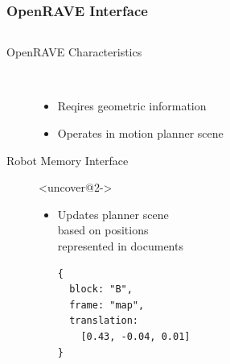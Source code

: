 \begin{frame}[fragile]
  \frametitle{OpenRAVE Interface}
  \begin{columns}
    \begin{column}{0.6\textwidth}
  \begin{description}
  \item[OpenRAVE Characteristics]%
                \hfill \\
    \begin{itemize}
    \item Reqires geometric information
    \item Operates in motion planner scene
    \end{itemize}
  \item[Robot Memory Interface]<uncover@2->
                \hfill \\
    \begin{itemize}
    \item Updates planner scene\\ based on positions\\ represented in documents
\begin{lstlisting}[style=SmallJSON,
  framexleftmargin=5pt, xleftmargin=0pt,linewidth=5cm,
 morekeywords={}, numbers=none]
{
  block: "B",
  frame: "map",
  translation:
    [0.43, -0.04, 0.01]
}
\end{lstlisting}
    \end{itemize}
  \end{description}
    \end{column}
    \begin{column}{0.4\textwidth}

\end{column}
\end{columns}
\end{frame}
